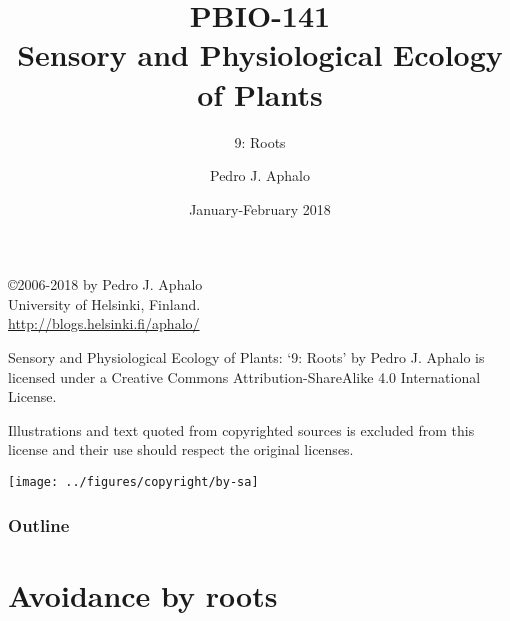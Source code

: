 \documentclass[10pt]{beamer}
\begin{document}
\title{PBIO-141\\Sensory and Physiological Ecology of  Plants}
\subtitle{9: Roots}
\author{Pedro J. Aphalo}
\date{January-February 2018}


  \begin{frame}
    \maketitle
  \end{frame}

  \begin{frame}[c]
    \begin{center}
      \begin{small}
        \copyright 2006-2018 by Pedro J. Aphalo\\
       University of Helsinki, Finland.\\
        \textcolor{blue}{\url{http://blogs.helsinki.fi/aphalo/}}\\[2ex]
      \end{small}

      \begin{footnotesize}
        Sensory and Physiological Ecology of  Plants: `9: Roots' by Pedro J. Aphalo is licensed under a Creative Commons Attribution-ShareAlike 4.0 International License.

        Illustrations and text quoted from copyrighted sources is excluded from this license and their use should respect the original licenses.\\[2ex]
      \end{footnotesize}

      \texttt{[image: ../figures/copyright/by-sa]}
    \end{center}
  \end{frame}

  \begin{frame}
    \frametitle{Outline}
    \tableofcontents
  \end{frame}

\section{Avoidance by roots}
\end{document}
